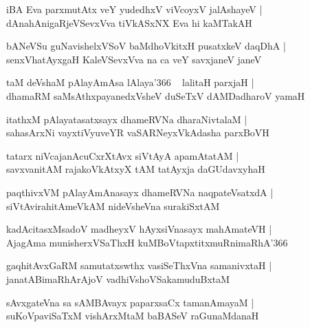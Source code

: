 \documentclass[twoside,12pt,openright]{book}
\newcounter{shloka}[chapter]
\begin{document}
\begin{shloka}%
iBA Eva parxmutAtx veY yudedhxV viVcoyxV jalAshayeV |\\
dAnahAnigaRjeVSevxVva tiVkASxNX Eva hi kaMTakAH 
\end{shloka}

\begin{shloka}%
bANeVSu guNavishelxVSoV baMdhoVkitxH pusatxkeV daqDhA |\\
senxVhatAyxgaH KaleVSevxVva na ca veY savxjaneV janeV 
\end{shloka}

\begin{shloka}%
taM deVshaM pAlayAmAsa lAlaya\char'366 ~ lalitaH parxjaH |\\
dhamaRM saMsAthxpayanedxVsheV duSeTxV dAMDadharoV yamaH
\end{shloka}

\begin{shloka}%
itathxM pAlayatasatxsayx dhameRVNa dharaNivtalaM |\\
sahasArxNi vayxtiVyuveYR vaSARNeyxVkAdasha parxBoVH 
\end{shloka}

\begin{shloka}%
tatarx niVcajanAcuCxrXtAvx siVtAyA apamAtatAM |\\
savxvanitAM rajakoVkAtxyX tAM tatAyxja daGUdavxyhaH
\end{shloka}

\begin{shloka}%
paqthivxVM pAlayAmAnasayx dhameRVNa naqpateVsatxdA |\\
siVtAvirahitAmeVkAM nideVsheVna surakiSxtAM 
\end{shloka}

\begin{shloka}%
kadAcitasxMsadoV madheyxV hAyxsiVnasayx mahAmateVH |\\
AjagAma munisherxVSaThxH kuMBoVtapxtitxmuRnimaRhA\char'366
\end{shloka}

\begin{shloka}%
gaqhitAvxGaRM samutatxswthx vasiSeThxVna samanivxtaH |\\
janatABimaRhArAjoV vadhiVshoVSakamuduBxtaM 
\end{shloka}

\begin{shloka}%
sAvxgateVna sa sAMBAvayx paparxsaCx tamanAmayaM |\\
suKoVpaviSaTxM vishArxMtaM baBASeV raGunaMdanaH
\end{shloka}
\end{document}
